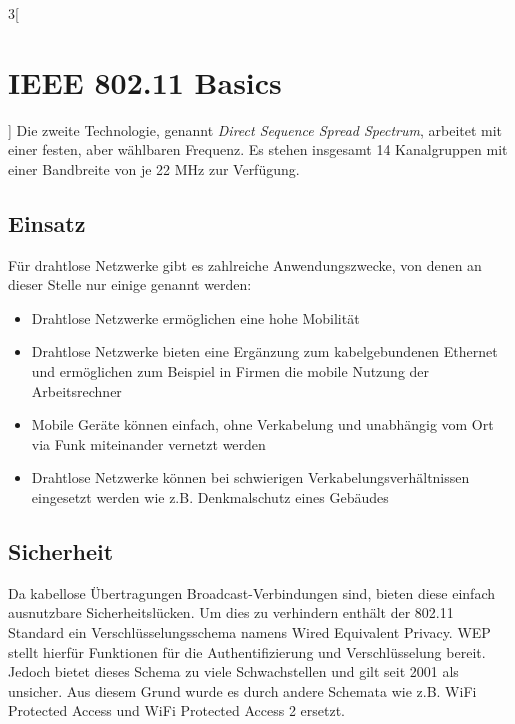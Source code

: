 \begin{multicols}{3}[\section{IEEE 802.11 Basics}]
Die zweite Technologie, genannt \textit{Direct Sequence Spread Spectrum},
arbeitet mit einer festen, aber wählbaren Frequenz. Es stehen insgesamt 14 Kanalgruppen mit einer Bandbreite von je 22 MHz zur Verfügung. 
~\cite{basics.4}


\subsection*{Einsatz}
Für drahtlose Netzwerke gibt es zahlreiche Anwendungszwecke, von denen an dieser Stelle nur einige genannt werden:
\begin{itemize}
	\item Drahtlose Netzwerke ermöglichen eine hohe Mobilität
	\item Drahtlose Netzwerke bieten  eine Ergänzung zum 				kabelgebundenen Ethernet und ermöglichen zum Beispiel in Firmen  die mobile Nutzung der Arbeitsrechner
	\item Mobile Geräte können einfach, ohne Verkabelung und unabhängig vom Ort via Funk miteinander vernetzt werden
	\item Drahtlose Netzwerke können bei schwierigen Verkabelungsverhältnissen eingesetzt werden wie z.B. Denkmalschutz eines Gebäudes~\cite{basics.8}
\end{itemize}

\subsection*{Sicherheit}

Da kabellose Übertragungen Broadcast-Verbindungen sind, bieten diese einfach ausnutzbare Sicherheitslücken. Um dies zu verhindern enthält der 802.11 Standard ein Verschlüsselungsschema namens Wired Equivalent Privacy. WEP stellt hierfür Funktionen für die Authentifizierung und Verschlüsselung bereit.
Jedoch bietet dieses Schema zu viele Schwachstellen und gilt seit 2001 als unsicher. Aus diesem Grund wurde es durch andere Schemata wie z.B. WiFi Protected Access und WiFi Protected Access 2 ersetzt.~\cite{basics.2}

\end{multicols}
\newpage

